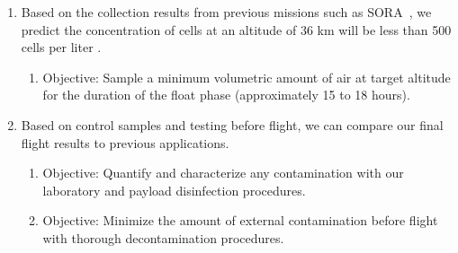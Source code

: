 \begin{enumerate}
\item Based on the collection results from previous missions such as SORA~\cite{SORA}, we predict the concentration of cells at an altitude of 36 km will be less than 500 cells per liter \citep{LSU}.
	\begin{enumerate}
	\item Objective: Sample a minimum volumetric amount of air at target altitude for the duration of the float phase (approximately 15 to 18 hours).
	\end{enumerate}
\item Based on control samples and testing before flight, we can compare our final flight results to previous applications.
	\begin{enumerate}
	\item Objective: Quantify and characterize any contamination with our laboratory and payload disinfection procedures.
	\item Objective: Minimize the amount of external contamination before flight with thorough decontamination procedures.
	\end{enumerate}

\end{enumerate}
